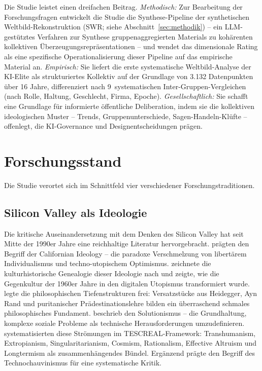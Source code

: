 \documentclass[12pt,a4paper]{article}
\begin{document}
Die Studie leistet einen dreifachen Beitrag. \emph{Methodisch:} Zur Bearbeitung der Forschungsfragen entwickelt die Studie die Synthese-Pipeline der synthetischen Weltbild-Rekonstruktion (SWR; siehe Abschnitt~\ref{sec:methodik}) -- ein LLM-gestütztes Verfahren zur Synthese gruppenaggregierten Materials zu kohärenten kollektiven Überzeugungsrepräsentationen -- und wendet das dimensionale Rating als eine spezifische Operationalisierung dieser Pipeline auf das empirische Material an. \emph{Empirisch:} Sie liefert die erste systematische Weltbild-Analyse der KI-Elite als strukturiertes Kollektiv auf der Grundlage von 3.132 Datenpunkten über 16 Jahre, differenziert nach 9~systematischen Inter-Gruppen-Vergleichen (nach Rolle, Haltung, Geschlecht, Firma, Epoche). \emph{Gesellschaftlich:} Sie schafft eine Grundlage für informierte öffentliche Deliberation, indem sie die kollektiven ideologischen Muster -- Trends, Gruppenunterschiede, Sagen-Handeln-Klüfte -- offenlegt, die KI-Governance und Designentscheidungen prägen.


\section{Forschungsstand}
\label{sec:forschungsstand}

Die Studie verortet sich im Schnittfeld vier verschiedener Forschungstraditionen.

\subsection{Silicon Valley als Ideologie}
\label{sec:forschungsstand:sv}

Die kritische Auseinandersetzung mit dem Denken des Silicon Valley hat seit Mitte der 1990er Jahre eine reichhaltige Literatur hervorgebracht. \citet{BarbCam1996} prägten den Begriff der \glqq Californian Ideology\grqq{} -- die paradoxe Verschmelzung von libertärem Individualismus und techno-utopischem Optimismus. \citet{Turner2006} zeichnete die kulturhistorische Genealogie dieser Ideologie nach und zeigte, wie die Gegenkultur der 1960er Jahre in den digitalen Utopismus transformiert wurde. \citet{Daub2020} legte die philosophischen Tiefenstrukturen frei: Versatzstücke aus Heidegger, Ayn Rand und puritanischer Prädestinationslehre bilden ein \glqq überraschend schmales philosophisches Fundament\grqq. \citet{Morozov2013} beschrieb den Solutionismus -- die Grundhaltung, komplexe soziale Probleme als technische Herausforderungen umzudefinieren. \citet{TorresGebru2024} systematisierten diese Strömungen im TESCREAL-Framework: Transhumanism, Extropianism, Singularitarianism, Cosmism, Rationalism, Effective Altruism und Longtermism als \glqq zusammenhängendes Bündel\grqq. Ergänzend prägte \citet{Broussard2018} den Begriff des \glqq Technochauvinismus\grqq{} für eine systematische Kritik.
\end{document}
